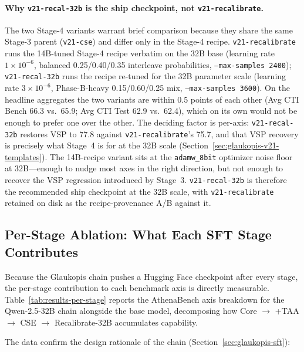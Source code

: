 \documentclass[webpdf,contemporary,large]{oup-authoring-template}
\theoremstyle{thmstyleone}
\theoremstyle{thmstyletwo}
\theoremstyle{thmstylethree}
\begin{document}
\paragraph{Why \texttt{v21-recal-32b} is the ship checkpoint, not \texttt{v21-recalibrate}.}
The two Stage-4 variants warrant brief comparison because they share the same Stage-3 parent (\texttt{v21-cse}) and differ only in the Stage-4 recipe. \texttt{v21-recalibrate} runs the 14B-tuned Stage-4 recipe verbatim on the 32B base (learning rate $1\times 10^{-6}$, balanced 0.25/0.40/0.35 interleave probabilities, \texttt{--max-samples 2400}); \texttt{v21-recal-32b} runs the recipe re-tuned for the 32B parameter scale (learning rate $3\times 10^{-6}$, Phase-B-heavy 0.15/0.60/0.25 mix, \texttt{--max-samples 3600}). On the headline aggregates the two variants are within 0.5 points of each other (Avg CTI Bench 66.3 vs.\ 65.9; Avg CTI Test 62.9 vs.\ 62.4), which on its own would not be enough to prefer one over the other. The deciding factor is per-axis: \texttt{v21-recal-32b} restores VSP to 77.8 against \texttt{v21-recalibrate}'s 75.7, and that VSP recovery is precisely what Stage~4 is for at the 32B scale (Section~\ref{sec:glaukopis-v21-templates}). The 14B-recipe variant sits at the \texttt{adamw\_8bit} optimizer noise floor at 32B---enough to nudge most axes in the right direction, but not enough to recover the VSP regression introduced by Stage~3. \texttt{v21-recal-32b} is therefore the recommended ship checkpoint at the 32B scale, with \texttt{v21-recalibrate} retained on disk as the recipe-provenance A/B against it.

\subsection{Per-Stage Ablation: What Each SFT Stage Contributes}
\label{sec:results-per-stage}

Because the Glaukopis chain pushes a Hugging Face checkpoint after every stage, the per-stage contribution to each benchmark axis is directly measurable. Table~\ref{tab:results-per-stage} reports the AthenaBench axis breakdown for the Qwen-2.5-32B chain alongside the base model, decomposing how Core $\to$ +TAA $\to$ CSE $\to$ Recalibrate-32B accumulates capability.

The data confirm the design rationale of the chain (Section~\ref{sec:glaukopis-sft}):
\end{document}
